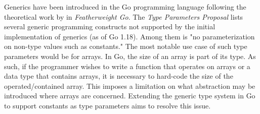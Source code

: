 Generics have been introduced in the Go programming language following the
theoretical work by \cite{fg} in \emph{Featherweight Go}. The \emph{Type
Parameters Proposal} \cite{genericsProposal} lists several generic programming
constructs not supported by the initial implementation of generics (as of Go
1.18). Among them is "no parameterization on non-type values such as
constants." The most notable use case of such type parameters would be for
arrays. In Go, the size of an array is part of its type. As such, if the
programmer wishes to write a function that operates on arrays or a data type
that contains arrays, it is necessary to hard-code the size of the
operated/contained array. This imposes a limitation on what abstraction may be
introduced where arrays are concerned. Extending the generic type system in Go
to support constants as type parameters aims to resolve this issue.
